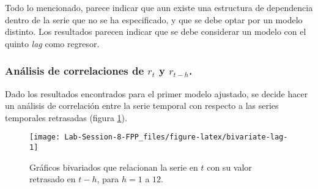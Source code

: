 \documentclass[]{article}
\newenvironment{Shaded}{\begin{snugshade}}{\end{snugshade}}
\newcommand{\DataTypeTok}[1]{\textcolor[rgb]{0.13,0.29,0.53}{#1}}
\newcommand{\DecValTok}[1]{\textcolor[rgb]{0.00,0.00,0.81}{#1}}
\newcommand{\KeywordTok}[1]{\textcolor[rgb]{0.13,0.29,0.53}{\textbf{#1}}}
\newcommand{\NormalTok}[1]{#1}
\newcommand{\OperatorTok}[1]{\textcolor[rgb]{0.81,0.36,0.00}{\textbf{#1}}}
\newcommand{\StringTok}[1]{\textcolor[rgb]{0.31,0.60,0.02}{#1}}
\begin{document}
Todo lo mencionado, parece indicar que aun existe una estructura de dependencia dentro de la serie que no se ha especificado, y que se debe optar por un modelo distinto. Los resultados parecen indicar que se debe considerar un modelo con el quinto \emph{lag} como regresor.

\hypertarget{anuxe1lisis-de-correlaciones-de-r_t-y-r_t-h.}{%
\subsubsection{\texorpdfstring{Análisis de correlaciones de \(r_t\) y \(r_{t-h}\).}{Análisis de correlaciones de r\_t y r\_\{t-h\}.}}\label{anuxe1lisis-de-correlaciones-de-r_t-y-r_t-h.}}

Dado los resultados encontrados para el primer modelo ajustado, se decide hacer un análisis de correlación entre la serie temporal con respecto a las series temporales retrasadas (figura \ref{fig:bivariate-lag}).

\begin{Shaded}
\end{Shaded}

\begin{figure}[!h]

{\centering \texttt{[image: Lab-Session-8-FPP\_files/figure-latex/bivariate-lag-1]} 

}

\caption{Gráficos bivariados que relacionan la serie en $t$ con su valor retrasado en $t-h$, para $h=1$ a $12$.}\label{fig:bivariate-lag}
\end{figure}
\end{document}
